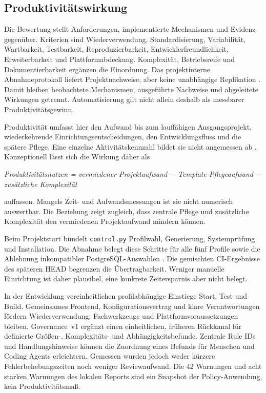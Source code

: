 \subsection{Produktivitätswirkung}
\label{subsec:produktivitaetswirkung}

Die Bewertung stellt Anforderungen, implementierte Mechanismen und Evidenz
gegenüber. Kriterien sind Wiederverwendung, Standardisierung, Variabilität,
Wartbarkeit, Testbarkeit, Reproduzierbarkeit, Entwicklerfreundlichkeit,
Erweiterbarkeit und Plattformabdeckung. Komplexität, Betriebsreife und
Dokumentierbarkeit ergänzen die Einordnung. Das projektinterne
Abnahmeprotokoll liefert Projektnachweise, aber keine unabhängige Replikation
\parencite{kleiveist2026acceptance}.
Damit bleiben beobachtete Mechanismen, ausgeführte Nachweise und abgeleitete
Wirkungen getrennt. Automatisierung gilt nicht allein deshalb als messbarer
Produktivitätsgewinn.

Produktivität umfasst hier den Aufwand bis zum lauffähigen Ausgangsprojekt,
wiederkehrende Einrichtungsentscheidungen, den Entwicklungsfluss und die
spätere Pflege. Eine einzelne Aktivitätskennzahl bildet sie nicht angemessen ab
\parencite{forsgren2021space}. Konzeptionell lässt sich die Wirkung daher als

\begin{center}
  \emph{Produktivitätsnutzen = vermiedener Projektaufwand
  $-$ Template-Pflegeaufwand $-$ zusätzliche Komplexität}
\end{center}

auffassen. Mangels Zeit- und Aufwandsmessungen ist sie nicht numerisch
auswertbar.
Die Beziehung zeigt zugleich, dass zentrale Pflege und zusätzliche Komplexität
den vermiedenen Projektaufwand mindern können.

Beim Projektstart bündelt \texttt{control.py} Profilwahl, Generierung,
Systemprüfung und Installation. Die Abnahme belegt diese Schritte für alle
fünf Profile sowie die Ablehnung inkompatibler PostgreSQL-Auswahlen
\parencite{kleiveist2026acceptance}. Die gemischten CI-Ergebnisse des späteren
HEAD begrenzen die Übertragbarkeit. Weniger manuelle Einrichtung ist daher
plausibel, eine konkrete Zeitersparnis aber nicht belegt.

In der Entwicklung vereinheitlichen profilabhängige Einstiege Start, Test und
Build. Gemeinsames Frontend, Konfigurationsvertrag und klare Verantwortungen
fördern Wiederverwendung; Fachwerkzeuge und Plattformvoraussetzungen bleiben.
Governance~v1 ergänzt einen einheitlichen, früheren Rückkanal für definierte
Größen-, Komplexitäts- und Abhängigkeitsbefunde. Zentrale Rule IDs und
Handlungshinweise können die Zuordnung eines Befunds für Menschen und Coding
Agents erleichtern. Gemessen wurden jedoch weder kürzere
Fehlerbehebungszeiten noch weniger Reviewaufwand. Die 42 Warnungen und acht
starken Warnungen des lokalen Reports sind ein Snapshot der Policy-Anwendung,
kein Produktivitätsmaß.

